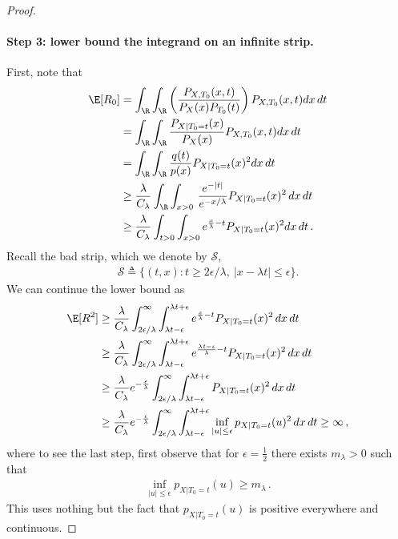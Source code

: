 \begin{proof}
    \paragraph{Step 3: lower bound the integrand on an infinite strip.}
    First, note that
    \begin{align}
        \E[R_0]
         & =
        \int_{\R}\int_{\R}
        \left(
        \frac{P_{X,T_0}(x, t)}{P_X(x) P_{T_0}(t)}
        \right)
        P_{X,T_0}(x, t) dx\,dt
        \\
         & =
        \int_{\R}\int_{\R}
        \frac{P_{X|T_0=t}(x)}{P_X(x)}
        P_{X,T_0}(x, t) dx\,dt
        \\
         & =
        \int_{\R}\int_{\R}
        \frac{q(t)}{p(x)} P_{X|T_0=t}(x)^2 dx\,dt
        \\
         & \ge
        \frac{\lambda}{C_\lambda}
        \int_{\R}\int_{x>0}
        \,\frac{
            e^{-|t|}
        }{e^{-x/\lambda}}
        P_{X|T_0=t}(x)^2
        \,dx\,dt
        \\
         & \geq
        \frac{\lambda}{C_\lambda}
        \int_{t>0}\int_{x>0}
        e^{\frac{x}{\lambda} - t}
        P_{X|T_0=t}(x)^2
        dx\,dt
        \,.
    \end{align}
    Recall the bad strip, which we denote by $\mathcal S$,
    \begin{align}
        \mathcal S \triangleq \{(t,x): t\ge 2\epsilon/\lambda,\ |x-\lambda t|\le \epsilon\}.
    \end{align}
    We can continue the lower bound as
    \begin{align}
        \E[R^2]
         & \geq
        \frac{\lambda}{C_\lambda}
        \int_{2\epsilon/\lambda}^\infty \int_{\lambda t - \epsilon}^{\lambda t + \epsilon}
        e^{\frac{x}{\lambda} - t}
        P_{X|T_0=t}(x)^2
        \,dx\,dt
        \\
         & \geq
        \frac{\lambda}{C_\lambda}
        \int_{2\epsilon/\lambda}^\infty \int_{\lambda t - \epsilon}^{\lambda t + \epsilon}
        e^{\frac{\lambda t - \epsilon}{\lambda} - t}
        P_{X|T_0=t}(x)^2
        \,dx\,dt
        \\
         & \geq
        \frac{\lambda}{C_\lambda}
        e^{-\frac{\epsilon}{\lambda}}
        \int_{2\epsilon/\lambda}^\infty \int_{\lambda t - \epsilon}^{\lambda t + \epsilon}
        P_{X|T_0=t}(x)^2
        \,dx\,dt
        \\
         & \geq
        \frac{\lambda}{C_\lambda}
        e^{-\frac{\epsilon}{\lambda}}
        \int_{2\epsilon/\lambda}^\infty \int_{\lambda t - \epsilon}^{\lambda t + \epsilon}
        \inf_{|u|\le \epsilon} p_{X|T_0=t}(u)^2 \,dx\,dt
        \geq
        \infty\,,
    \end{align}
    where to see the last step, first observe that for $\epsilon=\frac12$ there exists $m_\lambda>0$ such that
    \begin{align}
        \inf_{|u|\le \epsilon} p_{X|T_0=t}(u) \ge m_\lambda\,.
    \end{align}
    This uses nothing but the fact that $p_{X|T_0=t}(u)$ is positive everywhere and continuous.


\end{proof}
